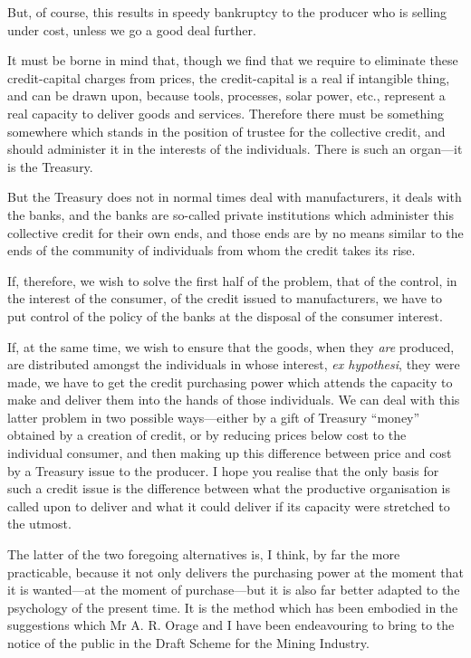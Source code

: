 \documentclass{book}
\begin{document}
But, of course, this results in speedy bankruptcy to the producer who is selling under cost, unless we go a good deal further.

It must be borne in mind that, though we find that we require to eliminate these credit-capital charges from prices, the credit-capital is a real if intangible thing, and can be drawn upon, because tools, processes, solar power, etc., represent a real capacity to deliver goods and services. Therefore there must be something somewhere which stands in the position of trustee for the collective credit, and should administer it in the interests of the individuals. There is such an organ—it is the Treasury.

But the Treasury does not in normal times deal with manufacturers, it deals with the banks, and the banks are so-called private institutions which administer this collective credit for their own ends, and those ends are by no means similar to the ends of the community of individuals from whom the credit takes its rise.

If, therefore, we wish to solve the first half of the problem, that of the control, in the interest of the consumer, of the credit issued to manufacturers, we have to put control of the policy of the banks at the disposal of the consumer interest.

If, at the same time, we wish to ensure that the goods, when they \emph{are} produced, are distributed amongst the individuals in whose interest, \emph{ex hypothesi}, they were made, we have to get the credit purchasing power which attends the capacity to make and deliver them into the hands of those individuals. We can deal with this latter problem in two possible ways—either by a gift of Treasury “money” obtained by a creation of credit, or by reducing prices below cost to the individual consumer, and then making up this difference between price and cost by a Treasury issue to the producer. I hope you realise that the only basis for such a credit issue is the difference between what the productive organisation is called upon to deliver and what it could deliver if its capacity were stretched to the utmost.

The latter of the two foregoing alternatives is, I think, by far the more practicable, because it not only delivers the purchasing power at the moment that it is wanted—at the moment of purchase—but it is also far better adapted to the psychology of the present time. It is the method which has been embodied in the suggestions which Mr A. R. Orage and I have been endeavouring to bring to the notice of the public in the Draft Scheme for the Mining Industry.
\end{document}
